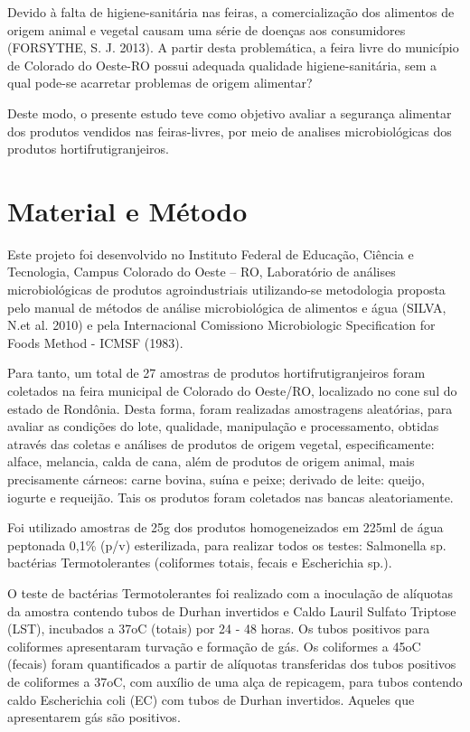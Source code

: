 \documentclass[article,12pt,onesidea,4paper,english,brazil]{abntex2}
\begin{document}
Devido à falta de higiene-sanitária nas feiras, a comercialização dos alimentos de origem animal e vegetal causam uma série de doenças aos consumidores (FORSYTHE, S. J. 2013). A partir desta problemática, a feira livre do município de Colorado do Oeste-RO possui adequada qualidade higiene-sanitária, sem a qual pode-se acarretar problemas de origem alimentar?

Deste modo, o presente estudo teve como objetivo avaliar a segurança alimentar dos produtos vendidos nas feiras-livres, por meio de analises microbiológicas dos produtos hortifrutigranjeiros.
	
	\section*{Material e Método}
	
Este projeto foi desenvolvido no Instituto Federal de Educação, Ciência e Tecnologia, Campus Colorado do Oeste – RO, Laboratório de análises microbiológicas de produtos agroindustriais utilizando-se metodologia proposta pelo manual de métodos de análise microbiológica de alimentos e água (SILVA, N.et al. 2010) e pela Internacional Comissiono Microbiologic Specification for Foods Method
- ICMSF (1983).

Para tanto, um total de 27 amostras de produtos hortifrutigranjeiros foram coletados na feira municipal de Colorado do Oeste/RO, localizado no cone sul do estado de Rondônia. Desta forma, foram realizadas amostragens aleatórias, para avaliar as condições do lote, qualidade, manipulação e processamento, obtidas através das coletas e análises de produtos de origem vegetal, especificamente: alface, melancia, calda de cana, além de produtos de origem animal, mais precisamente cárneos: carne bovina, suína e peixe; derivado de leite: queijo, iogurte e requeijão. Tais os produtos foram coletados nas bancas aleatoriamente.

Foi utilizado amostras de 25g dos produtos homogeneizados em 225ml de água peptonada 0,1\% (p/v) esterilizada, para realizar todos os testes: Salmonella sp. bactérias Termotolerantes (coliformes totais, fecais e Escherichia sp.).

O teste de bactérias Termotolerantes foi realizado com a inoculação de alíquotas da amostra contendo tubos de Durhan invertidos e Caldo Lauril Sulfato Triptose (LST), incubados a 37oC (totais) por 24 - 48 horas. Os tubos positivos para coliformes apresentaram turvação e formação de gás. Os coliformes a 45oC (fecais) foram quantificados a partir de alíquotas transferidas dos tubos positivos de coliformes a 37oC, com auxílio de uma alça de repicagem, para tubos contendo caldo Escherichia coli (EC) com tubos de Durhan invertidos. Aqueles que apresentarem gás são positivos.
\end{document}
